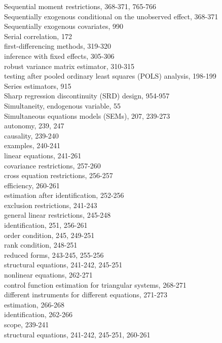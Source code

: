 \documentclass[10pt]{article}
\begin{document}
Sequential moment restrictions, 368-371, 765-766\\
Sequentially exogenous conditional on the unobserved effect, 368-371\\
Sequentially exogenous covariates, 990\\
Serial correlation, 172\\
first-differencing methods, 319-320\\
inference with fixed effects, 305-306\\
robust variance matrix estimator, 310-315\\
testing after pooled ordinary least squares (POLS) analysis, 198-199\\
Series estimators, 915\\
Sharp regression discontinuity (SRD) design, 954-957\\
Simultaneity, endogenous variable, 55\\
Simultaneous equations models (SEMs), 207, 239-273\\
autonomy, 239, 247\\
causality, 239-240\\
examples, 240-241\\
linear equations, 241-261\\
covariance restrictions, 257-260\\
cross equation restrictions, 256-257\\
efficiency, 260-261\\
estimation after identification, 252-256\\
exclusion restrictions, 241-243\\
general linear restrictions, 245-248\\
identification, 251, 256-261\\
order condition, 245, 249-251\\
rank condition, 248-251\\
reduced forms, 243-245, 255-256\\
structural equations, 241-242, 245-251\\
nonlinear equations, 262-271\\
control function estimation for triangular systems, 268-271\\
different instruments for different equations, 271-273\\
estimation, 266-268\\
identification, 262-266\\
scope, 239-241\\
structural equations, 241-242, 245-251, 260-261\\
\end{document}
